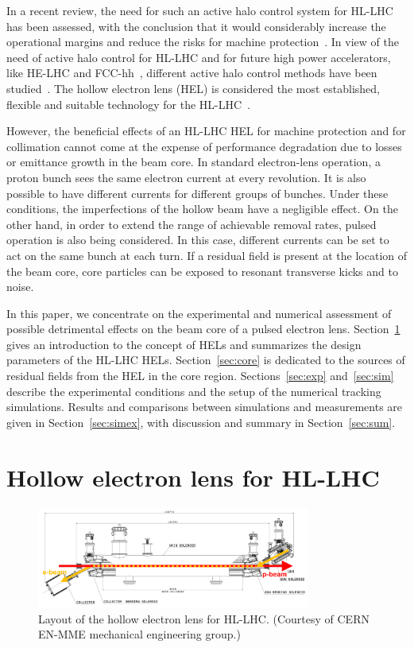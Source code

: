 \documentclass[
prstab
,reprint
,linenumbers
,longbibliography
,preprintnumbers
,showkeys
,amsfonts,amssymb,amsmath
,floatfix
]{revtex4-1}
\begin{document}
In a recent review, the need for such an active halo control system
for HL-LHC has been assessed, with the conclusion that it would
considerably increase the operational margins and reduce the risks for
machine protection~\cite{helreview}. In view of the need of active
halo control for HL-LHC and for future high power accelerators, like
HE-LHC and FCC-hh~\cite{helhcparam2011, fcc_coll_ipac2017}, different
active halo control methods have been
studied~\cite{helreview_bruce}. The hollow electron lens (HEL) is
considered the most established, flexible and suitable technology for
the HL-LHC~\cite{hel_tevatron_stancari, helreview}.

However, the beneficial effects of an HL-LHC HEL for machine
protection and for collimation cannot come at the expense of
performance degradation due to losses or emittance growth in the beam
core. In standard electron-lens operation, a proton bunch sees the
same electron current at every revolution. It is also possible to have
different currents for different groups of bunches. Under these
conditions, the imperfections of the hollow beam have a negligible
effect. On the other hand, in order to extend the range of achievable
removal rates, pulsed operation is also being considered. In this
case, different currents can be set to act on the same bunch at each
turn. If a residual field is present at the location of the beam core,
core particles can be exposed to resonant transverse kicks and to
noise.

In this paper, we concentrate on the experimental and numerical
assessment of possible detrimental effects on the beam core of a
pulsed electron lens. Section~\ref{sec:hel} gives an introduction to
the concept of HELs and summarizes the design parameters of the HL-LHC
HELs. Section~\ref{sec:core} is dedicated to the sources of residual
fields from the HEL in the core region. Sections~\ref{sec:exp}
and~\ref{sec:sim} describe the experimental conditions and the setup
of the numerical tracking simulations. Results and comparisons between
simulations and measurements are given in Section~\ref{sec:simex},
with discussion and summary in Section~\ref{sec:sum}.



\section{Hollow electron lens for HL-LHC}
\label{sec:hel}

\begin{figure}
  \includegraphics[width=0.8\textwidth]{hel_layout_epbeam}
  \caption{Layout of the hollow electron lens for HL-LHC. (Courtesy of
    CERN EN-MME mechanical engineering group.)}
  \label{fig:hel_layout}
\end{figure}
\end{document}
